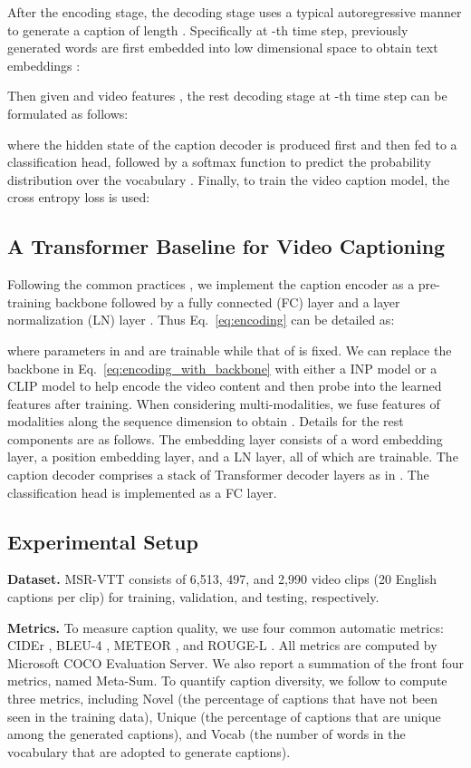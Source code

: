 \documentclass[runningheads]{llncs}
\begin{document}
After the encoding stage, the decoding stage uses a typical autoregressive manner to generate a caption  of length . Specifically at -th time step, previously generated words  are first embedded into low dimensional space to obtain text embeddings :

Then given  and video features , the rest decoding stage at -th time step can be formulated as follows:

where the hidden state  of the caption decoder is produced first and then fed to a classification head, followed by a softmax function to predict the probability distribution  over the vocabulary . Finally, to train the video caption model, the cross entropy loss is used:


\subsection{A Transformer Baseline for Video Captioning}
\label{sec:transformer_baseline}
Following the common practices \cite{zhang2021open,zhang2020object}, we implement the caption encoder as a pre-training backbone followed by a fully connected (FC) layer and a layer normalization (LN) layer \cite{ba2016layer}. Thus Eq.~\ref{eq:encoding} can be detailed as:

where parameters in  and  are trainable while that of  is fixed. We can replace the backbone in Eq.~\ref{eq:encoding_with_backbone} with either a INP model or a CLIP model to help encode the video content and then probe into the learned features  after training. When considering multi-modalities, we fuse features  of  modalities along the sequence dimension to obtain . Details for the rest components are as follows. The embedding layer consists of a word embedding layer, a position embedding layer, and a LN layer, all of which are trainable. The caption decoder comprises a stack of Transformer decoder layers as in \cite{vaswani2017attention}. The classification head is implemented as a FC layer. 


\subsection{Experimental Setup}
\label{sec:AL_experimental_setup}

\noindent\textbf{Dataset.} MSR-VTT\cite{xu2016msr} consists of 6,513, 497, and 2,990 video clips (20 English captions per clip) for training, validation, and testing, respectively.

\noindent\textbf{Metrics.} To measure caption quality, we use four common automatic metrics: CIDEr \cite{vedantam2015cider}, BLEU-4 \cite{papineni2002bleu}, METEOR \cite{banerjee2005meteor}, and ROUGE-L \cite{lin2004rouge}. All metrics are computed by Microsoft COCO Evaluation Server. We also report a summation of the front four metrics, named Meta-Sum. To quantify caption diversity, we follow \cite{yang2021non} to compute three metrics, including Novel (the percentage of captions that have not been seen in the training data), Unique (the percentage of captions that are unique among the generated captions), and Vocab (the number of words in the vocabulary that are adopted to generate captions). 
\end{document}
